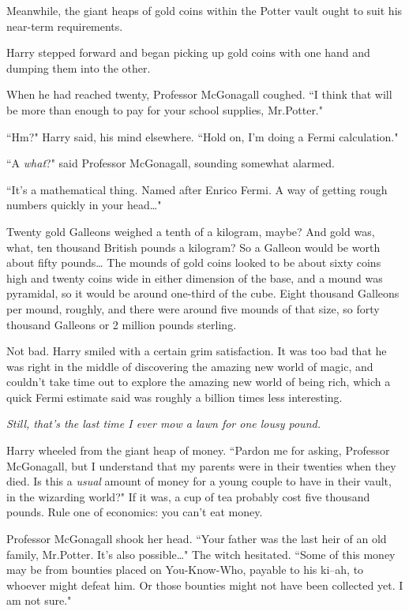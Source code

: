 Meanwhile, the giant heaps of gold coins within the Potter vault ought to suit his near-term requirements.

Harry stepped forward and began picking up gold coins with one hand and dumping them into the other.

When he had reached twenty, Professor McGonagall coughed. ``I think that will be more than enough to pay for your school supplies, Mr.\?Potter."

``Hm?" Harry said, his mind elsewhere. ``Hold on, I'm doing a Fermi calculation."

``A \emph{what}?" said Professor McGonagall, sounding somewhat alarmed.

``It's a mathematical thing. Named after Enrico Fermi. A way of getting rough numbers quickly in your head{\ldots}"

Twenty gold Galleons weighed a tenth of a kilogram, maybe? And gold was, what, ten thousand British pounds a kilogram? So a Galleon would be worth about fifty pounds{\ldots} The mounds of gold coins looked to be about sixty coins high and twenty coins wide in either dimension of the base, and a mound was pyramidal, so it would be around one-third of the cube. Eight thousand Galleons per mound, roughly, and there were around five mounds of that size, so forty thousand Galleons or 2 million pounds sterling.

Not bad. Harry smiled with a certain grim satisfaction. It was too bad that he was right in the middle of discovering the amazing new world of magic, and couldn't take time out to explore the amazing new world of being rich, which a quick Fermi estimate said was roughly a billion times less interesting.

\emph{Still, that's the last time I ever mow a lawn for one lousy pound.}

Harry wheeled from the giant heap of money. ``Pardon me for asking, Professor McGonagall, but I understand that my parents were in their twenties when they died. Is this a \emph{usual} amount of money for a young couple to have in their vault, in the wizarding world?" If it was, a cup of tea probably cost five thousand pounds. Rule one of economics: you can't eat money.

Professor McGonagall shook her head. ``Your father was the last heir of an old family, Mr.\?Potter. It's also possible{\ldots}" The witch hesitated. ``Some of this money may be from bounties placed on You-Know-Who, payable to his ki\---ah, to whoever might defeat him. Or those bounties might not have been collected yet. I am not sure."


